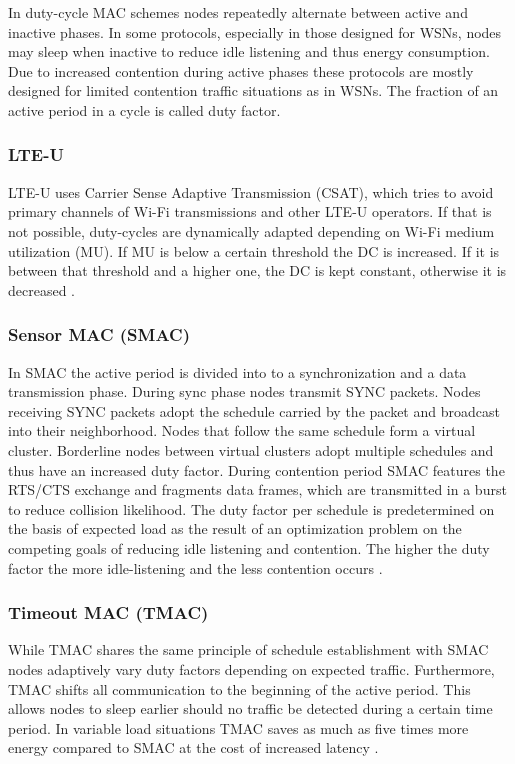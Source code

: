In duty-cycle MAC schemes nodes repeatedly alternate between active and inactive phases. In some protocols, especially in those designed for WSNs, nodes may sleep when inactive to reduce idle listening and thus energy consumption. Due to increased contention during active phases these protocols are mostly designed for limited contention traffic situations as in WSNs. The fraction of an active period in a cycle is called duty factor.

\subsubsection{LTE-U}
\label{sec:lteu}
LTE-U uses Carrier Sense Adaptive Transmission (CSAT), which tries to avoid primary channels of Wi-Fi transmissions and other LTE-U operators. If that is not possible, duty-cycles are dynamically adapted depending on Wi-Fi medium utilization (MU). If MU is below a certain threshold the DC is increased. If it is between that threshold and a higher one, the DC is kept constant, otherwise it is decreased \cite{qualcomm15}.

\subsubsection{Sensor MAC (SMAC)}

In SMAC the active period is divided into to a synchronization and a data transmission phase. During sync phase nodes transmit SYNC packets. Nodes receiving SYNC packets adopt the schedule carried by the packet and broadcast into their neighborhood. Nodes that follow the same schedule form a virtual cluster. Borderline nodes between virtual clusters adopt multiple schedules and thus have an increased duty factor. During contention period SMAC features the RTS/CTS exchange and fragments data frames, which are transmitted in a burst to reduce collision likelihood. The duty factor per schedule is predetermined on the basis of expected load as the result of an optimization problem on the competing goals of reducing idle listening and contention. The higher the duty factor the more idle-listening and the less contention occurs \cite{Bachir10}\cite{Demirkol06}.

\subsubsection{Timeout MAC (TMAC)}

While TMAC shares the same principle of schedule establishment with SMAC nodes adaptively vary duty factors depending on expected traffic. Furthermore, TMAC shifts all communication to the beginning of the active period. This allows nodes to sleep earlier should no traffic be detected during a certain time period. In variable load situations TMAC saves as much as five times more energy compared to SMAC at the cost of increased latency \cite{Bachir10}. 

